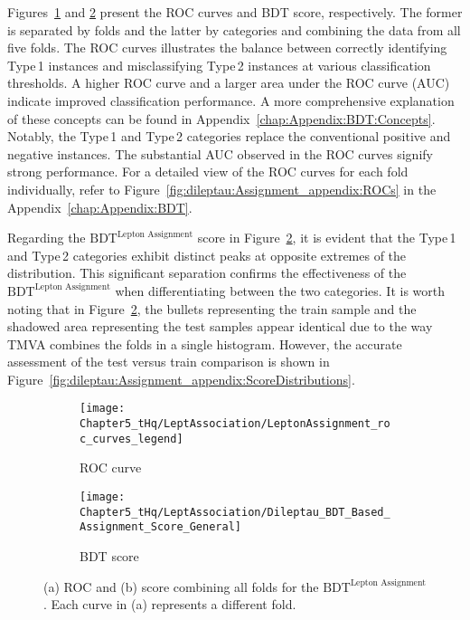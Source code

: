 Figures~\ref{fig:dileptau:Assignment:ROC_and_Score:ROC} and 
\ref{fig:dileptau:Assignment:ROC_and_Score:Score} present the 
ROC curves and BDT score, respectively. The former is separated by folds
and the latter by categories and 
combining the data from all five folds. The ROC curves illustrates the 
balance between correctly identifying Type$\,$1 instances and misclassifying 
Type$\,$2 instances at various classification thresholds. A higher ROC 
curve and a larger area under the ROC curve (AUC) indicate improved 
classification performance. A more comprehensive explanation of these 
concepts can be found in Appendix~\ref{chap:Appendix:BDT:Concepts}. 
Notably, the Type$\,$1 and Type$\,$2 categories replace the conventional 
positive and negative instances. The substantial AUC observed in the ROC 
curves signify strong performance. For a detailed view of the ROC curves for
each fold individually, refer to Figure~\ref{fig:dileptau:Assignment_appendix:ROCs}
in the Appendix~\ref{chap:Appendix:BDT}.

Regarding the $\text{BDT}^{\text{Lepton Assignment}}$
 score in Figure~\ref{fig:dileptau:Assignment:ROC_and_Score:Score}, 
it is evident that the Type$\,$1 and Type$\,$2 categories exhibit distinct peaks at opposite 
extremes of the distribution. This significant separation confirms the effectiveness of the 
$\text{BDT}^{\text{Lepton Assignment}}$
 when differentiating between the two categories. It is worth noting that in Figure~\ref{fig:dileptau:Assignment:ROC_and_Score:Score}, the bullets 
representing the train sample and the shadowed area representing the test samples 
appear identical due to the way TMVA combines the folds in a single histogram. 
However, the accurate assessment of the test versus train comparison is shown in Figure~\ref{fig:dileptau:Assignment_appendix:ScoreDistributions}.

\begin{figure}[h]
  \begin{subfigure}[h]{0.51\linewidth}
  	\texttt{[image: Chapter5\_tHq/LeptAssociation/LeptonAssignment\_roc\_curves\_legend]}
	\caption{ROC curve}
	\label{fig:dileptau:Assignment:ROC_and_Score:ROC}
  \end{subfigure}
  \begin{subfigure}[h]{0.49\linewidth}
	\texttt{[image: Chapter5\_tHq/LeptAssociation/Dileptau\_BDT\_Based\_Assignment\_Score\_General]}
	\caption{BDT score} 
	\label{fig:dileptau:Assignment:ROC_and_Score:Score}
  \end{subfigure}%
\caption{(a) ROC and (b) score combining all folds for the $\text{BDT}^{\text{Lepton Assignment}}$.
Each curve in (a) represents a different fold.  }%
\label{fig:dileptau:Assignment:ROC_and_Score}
\end{figure}
		 
